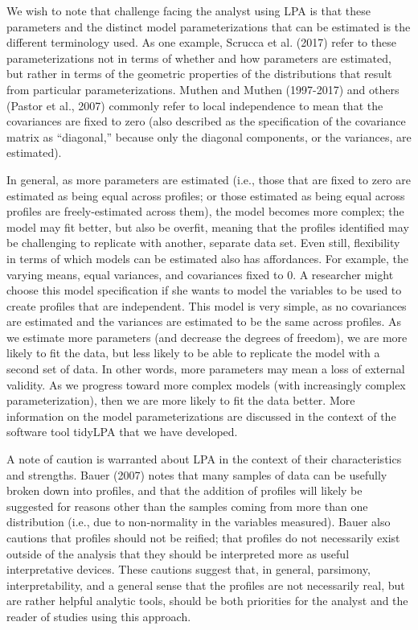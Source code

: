 \documentclass[man]{apa6}
\begin{document}
We wish to note that challenge facing the analyst using LPA is that these
parameters and the distinct model parameterizations that can be estimated is the
different terminology used. As one example, Scrucca et al. (2017) refer to these
parameterizations not in terms of whether and how parameters are estimated, but
rather in terms of the geometric properties of the distributions that result
from particular parameterizations. Muthen and Muthen (1997-2017) and others
(Pastor et al., 2007) commonly refer to local independence to mean that the
covariances are fixed to zero (also described as the specification of the
covariance matrix as \enquote{diagonal,} because only the diagonal components, or the
variances, are estimated).

In general, as more parameters are estimated (i.e., those that are fixed to zero
are estimated as being equal across profiles; or those estimated as being equal
across profiles are freely-estimated across them), the model becomes more
complex; the model may fit better, but also be overfit, meaning that the
profiles identified may be challenging to replicate with another, separate data
set. Even still, flexibility in terms of which models can be estimated also has
affordances. For example, the varying means, equal variances, and covariances
fixed to 0. A researcher might choose this model specification if she wants to
model the variables to be used to create profiles that are independent. This
model is very simple, as no covariances are estimated and the variances are
estimated to be the same across profiles. As we estimate more parameters (and
decrease the degrees of freedom), we are more likely to fit the data, but less
likely to be able to replicate the model with a second set of data. In other
words, more parameters may mean a loss of external validity. As we progress
toward more complex models (with increasingly complex parameterization), then we
are more likely to fit the data better. More information on the model
parameterizations are discussed in the context of the software tool tidyLPA that
we have developed.

A note of caution is warranted about LPA in the context of their characteristics
and strengths. Bauer (2007) notes that many samples of data can be usefully
broken down into profiles, and that the addition of profiles will likely be
suggested for reasons other than the samples coming from more than one
distribution (i.e., due to non-normality in the variables measured). Bauer also
cautions that profiles should not be reified; that profiles do not necessarily
exist outside of the analysis that they should be interpreted more as useful
interpretative devices. These cautions suggest that, in general, parsimony,
interpretability, and a general sense that the profiles are not necessarily
real, but are rather helpful analytic tools, should be both priorities for the
analyst and the reader of studies using this approach.
\end{document}

